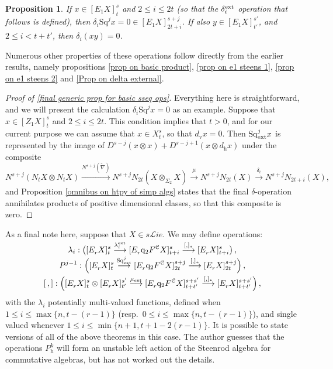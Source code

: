 \documentclass[11pt]{amsart} \renewcommand{\baselinestretch}{1.4}
\theoremstyle{plain}
\newtheorem{prop}[thm]{Proposition}
\theoremstyle{definition}
\renewcommand{\to}{\longrightarrow}
\newcommand{\scrL}{\mathscr{L}}
\newcommand{\calc}{\mathcal{C}}
\newcommand{\quadgrad}[1]{\mathrm{q}_{#1}}
\newcommand{\Nabla}{\nabla}
\newcommand{\Sq}{\mathrm{Sq}}
\newcommand{\liealgs}{{\scrL\!\textit{ie}}}
\newcommand{\Edownup}[5]{[E_{#1}^{#2}#3]^{#4}_{#5}}
\newcommand{\EZdownup}[5]{[Z^{#2}_{#1}#3]^{#4}_{#5}}
\newcommand{\dver}{_\mathrm{v}}
\newcommand{\dhor}{_\mathrm{h}}
\begin{document}
\begin{second quadrant homotopy sseq operations}
\begin{prop}
If $x\in \Edownup{1}{}{X}{s}{t}$ and $2\leq i \leq 2t$ (so that the $\delta^\textup{ext}_i$ operation that follows is defined), then $\delta_i\Sq^jx=0\in \Edownup{1}{}{X}{s+j}{2t+i}$. If also $y\in \Edownup{1}{}{X}{s'}{t'}$, and $2\leq i <t+t'$, then $\delta_i(xy)=0$.
\end{prop}
\noindent Numerous other properties of these operations follow directly from the earlier results, namely propositions \ref{prop on basic product}, \ref{prop on e1 steens 1}, \ref{prop on e1 steens 2} and \ref{Prop on delta external}.
\begin{proof}[Proof of \ref{final generic prop for basic sseq ops}]
Everything here is straightforward, and we will present the calculation 
$\delta_i\Sq^jx=0$ as an example.
Suppose that $x\in \EZdownup{1}{}{X}{s}{t}$ and $2\leq i\leq 2t$. This condition implies that $t>0$, and for our current purpose we can assume that $x\in X^s_t$, so that $d\dver x=0$.  Then $\Sq^j_\textup{ext}x$ is represented by the image of $D^{s-j}(x\otimes x)+D^{s-j+1}(x\otimes d\dhor x)$ under the composite
\[N^{s+j}(N_tX\otimes N_tX)\overset{N^{s+j}(\widetilde{\Nabla})}{\to}N^{s+j}N_{2t}(X\otimes_{\Sigma_2} X)\overset{\mu}{\to}N^{s+j}N_{2t}(X)\overset{\delta_i}{\to}N^{s+j}N_{2t+i}(X),\]
and Proposition \ref{omnibus on htpy of simp algs} states that the final $\delta$-operation annihilates products of positive dimensional classes, so that this composite is zero.
\end{proof}

As a final note here, suppose that $X\in s\liealgs$. We may define operations:
\begin{gather*}
\lambda_i:\left(\Edownup{r}{}{X}{s}{t} \smash{{}\overset{\lambda_i^\textup{ext}}{\to}{}} \Edownup{r}{}{\quadgrad{2}F^\calc X}{s}{t+i}\smash{{}\overset{[,]_*}{\to} {}}
\Edownup{r}{}{X}{s}{t+i}\right),
\\
P^{j-1}:\left(\Edownup{r}{}{X}{s}{t}   \smash{{}\overset{\Sq^j_\textup{ext}}{\to}{}} \Edownup{r}{}{\quadgrad{2}F^\calc X}{s+j}{2t}\smash{{}\overset{[,]_*}{\to} {}}
\Edownup{r}{}{X}{s+j}{2t}\right),\\
[\,,]:\left(\Edownup{r}{}{X}{s}{t}\otimes \Edownup{r}{}{X}{s'}{t'}\smash{{}\overset{\mu_\textup{ext}}{\to}{}} \Edownup{r}{}{\quadgrad{2}F^\calc X}{s+s'}{t+t'}\smash{{}\overset{[,]_*}{\to} {}}
\Edownup{r}{}{X}{s+s'}{t+t'}\right),
\end{gather*}
with the $\lambda_i$ potentially multi-valued functions,  defined when $1\leq i\leq \max\{n,t-(r-1)\}$ (resp.\ $0\leq i\leq \max\{n,t-(r-1)\}$), and single valued whenever $1\leq i\leq\min\{n+1,t+1-2(r-1)\}$.
It is possible to state versions of all of the above theorems in this case. The author guesses that the operations $P\dhor^{k}$ will form an unstable left action of the Steenrod algebra for commutative algebras, but has not worked out the details.


\end{second quadrant homotopy sseq operations}
\end{document}
